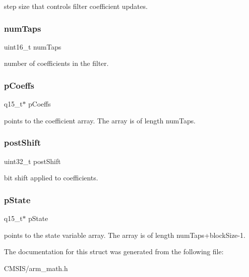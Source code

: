 step size that controls filter coefficient updates. \mbox{\label{structarm__lms__instance__q15_a751941891e47f522a7f5375fe8990aac}} 
\subsubsection{\texorpdfstring{numTaps}{numTaps}}
{\footnotesize\ttfamily uint16\+\_\+t num\+Taps}

number of coefficients in the filter. \mbox{\label{structarm__lms__instance__q15_a7ca181a37f714d174445f486bebce26f}} 
\subsubsection{\texorpdfstring{pCoeffs}{pCoeffs}}
{\footnotesize\ttfamily q15\+\_\+t$\ast$ p\+Coeffs}

points to the coefficient array. The array is of length num\+Taps. \mbox{\label{structarm__lms__instance__q15_aa2cacddfc5e1d86905d7d31a18b1979b}} 
\subsubsection{\texorpdfstring{postShift}{postShift}}
{\footnotesize\ttfamily uint32\+\_\+t post\+Shift}

bit shift applied to coefficients. \mbox{\label{structarm__lms__instance__q15_ae29dfdb736374fcddaeaec4b7770170c}} 
\subsubsection{\texorpdfstring{pState}{pState}}
{\footnotesize\ttfamily q15\+\_\+t$\ast$ p\+State}

points to the state variable array. The array is of length num\+Taps+block\+Size-\/1. 

The documentation for this struct was generated from the following file\+:\begin{DoxyCompactItemize}
\item 
C\+M\+S\+I\+S/arm\+\_\+math.\+h\end{DoxyCompactItemize}
